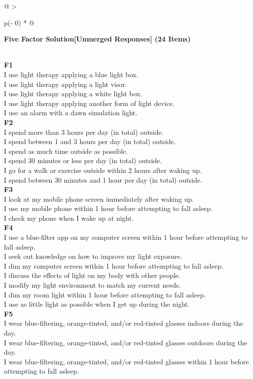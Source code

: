 \documentclass[
  english,
  man]{apa6}
\begin{document}
\begin{appendix}
\begin{longtable}[]{@{}
  >{\raggedright\arraybackslash}p{(\columnwidth - 0\tabcolsep) * }@{}}
\toprule
\begin{minipage}[b]{\linewidth}\raggedright
\textbf{Five Factor Solution{[}Unmerged Responses{]} (24 Items)}
\end{minipage} \\
\midrule
\endhead
\textbf{F1} \\
I use light therapy applying a blue light box. \\
I use light therapy applying a light visor. \\
I use light therapy applying a white light box. \\
I use light therapy applying another form of light device. \\
I use an alarm with a dawn simulation light. \\
\textbf{F2} \\
I spend more than 3 hours per day (in total) outside. \\
I spend between 1 and 3 hours per day (in total) outside. \\
I spend as much time outside as possible. \\
I spend 30 minutes or less per day (in total) outside. \\
I go for a walk or exercise outside within 2 hours after waking up. \\
I spend between 30 minutes and 1 hour per day (in total) outside. \\
\textbf{F3} \\
I look at my mobile phone screen immediately after waking up. \\
I use my mobile phone within 1 hour before attempting to fall asleep. \\
I check my phone when I wake up at night. \\
\textbf{F4} \\
I use a blue-filter app on my computer screen within 1 hour before
attempting to fall asleep. \\
I seek out knowledge on how to improve my light exposure. \\
I dim my computer screen within 1 hour before attempting to fall
asleep. \\
I discuss the effects of light on my body with other people. \\
I modify my light environment to match my current needs. \\
I dim my room light within 1 hour before attempting to fall asleep. \\
I use as little light as possible when I get up during the night. \\
\textbf{F5} \\
I wear blue-filtering, orange-tinted, and/or red-tinted glasses indoors
during the day. \\
I wear blue-filtering, orange-tinted, and/or red-tinted glasses outdoors
during the day. \\
I wear blue-filtering, orange-tinted, and/or red-tinted glasses within 1
hour before attempting to fall asleep. \\
\bottomrule
\end{longtable}


\end{appendix}
\end{document}
